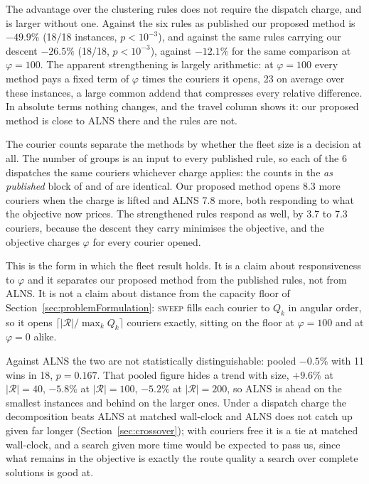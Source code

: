 The advantage over the clustering rules does not require the dispatch charge,
and is larger without one. Against the six rules as published our proposed method is
$-49.9\%$ (18/18 instances, $p<10^{-3}$), and
against the same rules carrying our descent $-26.5\%$
(18/18, $p<10^{-3}$), against $-12.1\%$ for the
same comparison at $\varphi = 100$. The apparent strengthening is largely
arithmetic: at $\varphi = 100$ every method pays a fixed term of $\varphi$ times
the couriers it opens, 23 on average over these instances, a large
common addend that compresses every relative difference. In absolute terms nothing changes, and the travel column shows it: our proposed
method is close to ALNS there and the rules are not.


The courier counts separate the methods by whether the fleet size is a decision
at all. The number of groups is an input to every published rule, so each of the
6 dispatches the same couriers whichever charge applies: the counts in the \emph{as published} block of 
and of  are identical. Our proposed method opens
8.3 more couriers when the charge is lifted and ALNS
7.8 more, both responding to what the objective now prices. The
strengthened rules respond as well, by 3.7 to 7.3
couriers, because the descent they carry minimises the objective, and the
objective charges $\varphi$ for every courier opened.

This is the form in which the fleet result holds. It is a claim about
responsiveness to $\varphi$ and it separates our proposed method from the
published rules, not from ALNS. It is not a claim about distance from the
capacity floor of Section~\ref{sec:problemFormulation}: \textsc{sweep} fills
each courier to $Q_k$ in angular order, so it opens
$\lceil|\mathcal{R}|/\max_k Q_k\rceil$ couriers exactly, sitting on the floor
at $\varphi=100$ and at $\varphi=0$ alike.


Against ALNS the two are not statistically distinguishable: pooled
$-0.5\%$ with 11 wins in 18, $p=0.167$. That
pooled figure hides a trend with size, $+9.6\%$ at $|\mathcal{R}|=40$, $-5.8\%$ at $|\mathcal{R}|=100$, $-5.2\%$ at $|\mathcal{R}|=200$, so ALNS is ahead on the
smallest instances and behind on the larger ones.
Under a dispatch charge the decomposition beats ALNS at matched
wall-clock and ALNS does not catch up given far longer
(Section~\ref{sec:crossover}); with couriers free it is a tie at matched
wall-clock, and a search given more time would be expected to pass us, since
what remains in the objective is exactly the route quality a search over
complete solutions is good at.

